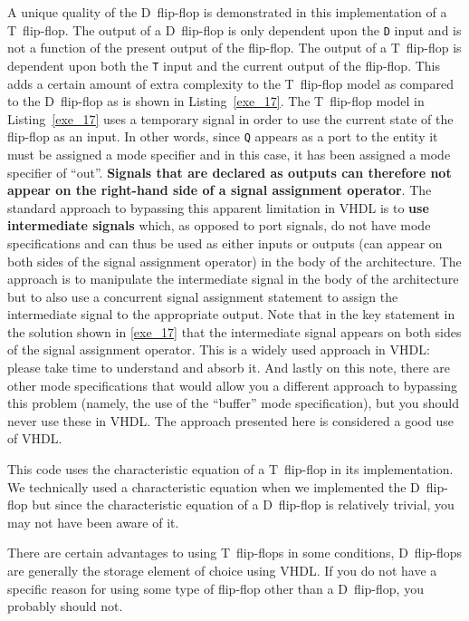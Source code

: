 \begin{my_list}
\item A unique quality of the D~flip-flop is demonstrated in this implementation of a T~flip-flop. The output of a D~flip-flop is only dependent upon the \texttt{D} input and is not a function of the present output of the flip-flop. The output of a T~flip-flop is dependent upon both the \texttt{T} input and the current output of the flip-flop. This adds a certain amount of extra complexity to the T~flip-flop model as compared to the D~flip-flop as is shown in Listing~\ref{exe_17}. The T~flip-flop model in Listing~\ref{exe_17} uses a temporary signal in order to use the current state of the flip-flop as an input. In other words, since \texttt{Q} appears as a port to the entity it must be assigned a mode specifier and in this case, it has been assigned a mode specifier of ``out''. \textbf{Signals that are declared as outputs can therefore not appear on the right-hand side of a signal assignment operator}. The standard approach to bypassing this apparent limitation in VHDL is to \textbf{use intermediate signals} which, as opposed to port signals, do not have mode specifications and can thus be used as either inputs or outputs (can appear on both sides of the signal assignment operator) in the body of the architecture. The approach is to manipulate the intermediate signal in the body of the architecture but to also use a concurrent signal assignment statement to assign the intermediate signal to the appropriate output. Note that in the key statement in the solution shown in \ref{exe_17} that the intermediate signal appears on both sides of the signal assignment operator. This is a widely used approach in VHDL: please take time to understand and absorb it. And lastly on this note, there are other mode specifications that would allow you a different approach to bypassing this problem (namely, the use of the ``buffer'' mode specification), but you should never use these in VHDL. The approach presented here is considered a good use of VHDL.

\item This code uses the characteristic equation of a T~flip-flop in its implementation. We technically used a characteristic equation when we implemented the D~flip-flop but since the characteristic equation of a D~flip-flop is relatively trivial, you may not have been aware of it.
\item There are certain advantages to using T~flip-flops in some conditions, D~flip-flops are generally the storage element of choice using VHDL. If you do not have a specific reason for using some type of flip-flop other than a D~flip-flop, you probably should not.
\end{my_list}

